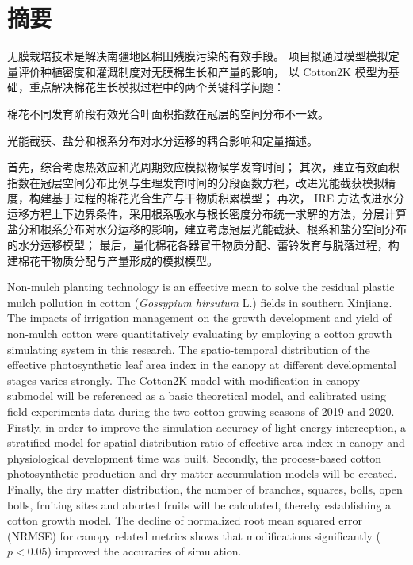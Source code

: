 \chapter*{摘要}
无膜栽培技术是解决南疆地区棉田残膜污染的有效手段。
项目拟通过模型模拟定量评价种植密度和灌溉制度对无膜棉生长和产量的影响，
以 Cotton2K 模型为基础，重点解决棉花生长模拟过程中的两个关键科学问题：
\begin{enumerate*}
    \item 棉花不同发育阶段有效光合叶面积指数在冠层的空间分布不一致。
    \item 光能截获、盐分和根系分布对水分运移的耦合影响和定量描述。
\end{enumerate*}
首先，综合考虑热效应和光周期效应模拟物候学发育时间；
其次，建立有效面积指数在冠层空间分布比例与生理发育时间的分段函数方程，改进光能截获模拟精度，构建基于过程的棉花光合生产与干物质积累模型；
再次， IRE 方法改进水分运移方程上下边界条件，采用根系吸水与根长密度分布统一求解的方法，分层计算盐分和根系分布对水分运移的影响，建立考虑冠层光能截获、根系和盐分空间分布的水分运移模型；
最后，量化棉花各器官干物质分配、蕾铃发育与脱落过程，构建棉花干物质分配与产量形成的模拟模型。

Non-mulch planting technology is an effective mean to solve the residual plastic mulch pollution in cotton (\textit{Gossypium hirsutum} L.) fields in southern Xinjiang.
The impacts of irrigation management on the growth development and yield of non-mulch cotton were quantitatively evaluating by employing a cotton growth simulating system in this research.
The spatio-temporal distribution of the effective photosynthetic leaf area index in the canopy at different developmental stages varies strongly.
The Cotton2K model with modification in canopy submodel will be referenced as a basic theoretical model, and calibrated using field experiments data during the two cotton growing seasons of 2019 and 2020.
Firstly, in order to improve the simulation accuracy of light energy interception, a stratified model for spatial distribution ratio of effective area index in canopy and physiological development time was built.
Secondly, the process-based cotton photosynthetic production and dry matter accumulation models will be created.
Finally, the dry matter distribution, the number of branches, squares, bolls, open bolls, fruiting sites and aborted fruits will be calculated, thereby establishing a cotton growth model.
The decline of normalized root mean squared error (NRMSE) for canopy related metrics shows that modifications significantly ($p < 0.05$) improved the accuracies of simulation.
